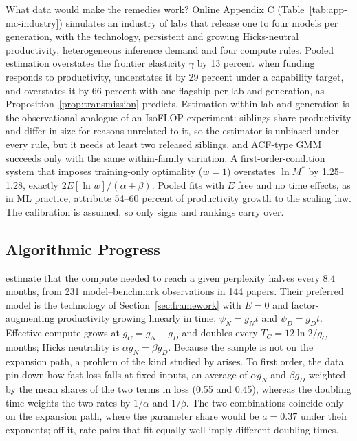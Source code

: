 What data would make the remedies work? Online Appendix C (Table~\ref{tab:app-mc-industry}) simulates an industry of labs that release one to four models
per generation, with the \citet{besiroglu2024chinchilla} technology, persistent and growing Hicks-neutral productivity,
heterogeneous inference demand and four compute rules. Pooled estimation overstates the frontier elasticity $\gamma$ by
13 percent when funding responds to productivity, understates it by 29 percent under a capability target, and
overstates it by 66 percent with one flagship per lab and generation, as Proposition~\ref{prop:transmission} predicts.
Estimation within lab and generation is the observational analogue of an IsoFLOP experiment: siblings share productivity
and differ in size for reasons unrelated to it, so the estimator is unbiased under every rule, but it needs at least
two released siblings, and ACF-type GMM succeeds only with the same within-family variation. A first-order-condition system
that imposes training-only optimality ($w=1$) overstates $\ln M^*$ by 1.25--1.28, exactly $2E[\ln w]/(\alpha+\beta)$.
Pooled fits with $E$ free and no time effects, as in ML practice, attribute 54--60 percent of productivity growth to the
scaling law. The calibration is assumed, so only signs and rankings carry over.

\subsection{Algorithmic Progress}

\citet{ho2024algorithmic} estimate that the compute needed to reach a given perplexity halves every 8.4 months, from 231
model--benchmark observations in 144 papers. Their preferred model is the technology of Section~\ref{sec:framework} with
$E=0$ and factor-augmenting productivity growing linearly in time, $\psi_N=g_Nt$ and $\psi_D=g_Dt$. Effective compute
grows at $g_C=g_N+g_D$ and doubles every $T_C=12\ln2/g_C$ months; Hicks neutrality is $\alpha g_N=\beta g_D$. Because the
sample is not on the expansion path, a problem of the kind studied by \citet{diamond1978measurement} arises. To first
order, the data pin down how fast loss falls at fixed inputs, an average of $\alpha g_N$ and $\beta g_D$ weighted by the
mean shares of the two terms in loss (0.55 and 0.45), whereas the doubling time weights the two rates by $1/\alpha$ and
$1/\beta$. The two combinations coincide only on the expansion path, where the parameter share would be $a=0.37$ under
their exponents; off it, rate pairs that fit equally well imply different doubling times.

